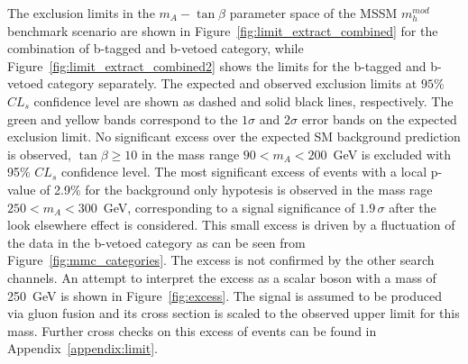 The exclusion limits in the $m_A - \tan\beta$ parameter space  of the MSSM  $m_{h}^{mod}$ benchmark scenario
are  shown in Figure~\ref{fig:limit_extract_combined} for the combination of b-tagged and b-vetoed category, while Figure~\ref{fig:limit_extract_combined2}
shows the limits for the  b-tagged and b-vetoed category separately. 
The expected and observed exclusion limits at $95\%$ $CL_s$  confidence level 
are shown as dashed and solid black lines, respectively. The green 
and yellow bands correspond to the $1\sigma$ and $2\sigma$ error bands on the expected exclusion limit. 
No significant excess over the expected SM background prediction is observed, $\tan\beta \geq 10$ in 
the mass range $90<m_A<200$~GeV is excluded with 95\%  $CL_s$ confidence level. 
The most significant excess of events with a  local p-value of 2.9\% for the background only hypotesis is observed in the mass rage $250< m_A <300$~GeV,
corresponding to a signal significance of $1.9\,\sigma$ after the look elsewhere effect is considered. 
This small excess is driven by a fluctuation of the data in the b-vetoed category as can be seen from Figure~\ref{fig:mmc_categories}.
The excess is not confirmed by the other search channels.
An attempt to interpret the excess as a scalar boson with a mass of 250~GeV is shown in Figure~\ref{fig:excess}. 
The signal is assumed to be produced via gluon fusion and its cross section is scaled to the observed upper limit for this mass.
Further cross checks on this excess of events can be found in Appendix~\ref{appendix:limit}.

